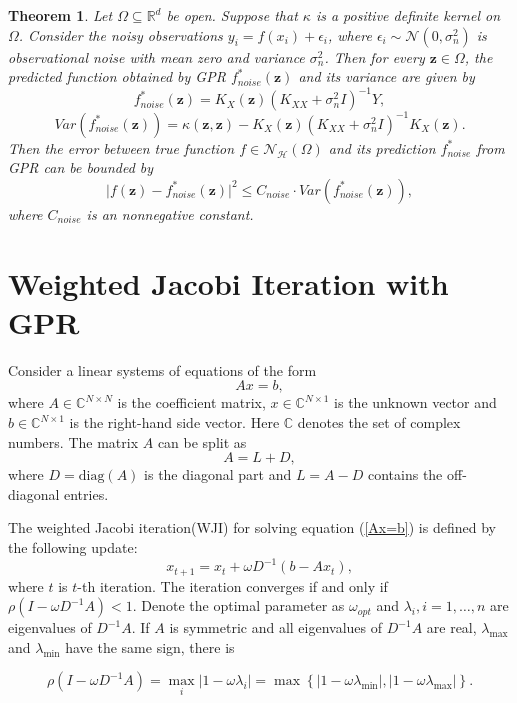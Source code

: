 \documentclass[preprint,review,sort&compress,3p]{elsarticle}
\newtheorem{thm}{Theorem }[section]
\begin{document}
\begin{thm}
	Let $\Omega \subseteq \mathbb{R}^d$ be open. Suppose that $\kappa$ is a positive definite kernel on $\Omega$. Consider the noisy observations $y_i = f(x_i)+\epsilon_i$, where $\epsilon_i\sim\mathcal{N}(0,\sigma_n^2)$ is observational noise with mean zero and variance $\sigma_n^2$.
	Then for every $\boldsymbol{z}\in \Omega$, the predicted function obtained by GPR $f_{noise}^*(\boldsymbol{z})$  and  its variance are given by 
	\[f_{noise}^*(\boldsymbol{z}) = K_X(\boldsymbol{z}) (K_{XX}+\sigma_n^2 I)^{-1} Y,
	\]
	\[
	Var(f_{noise}^*(\boldsymbol{z})) = \kappa(\boldsymbol{z},\boldsymbol{z})-K_X(\boldsymbol{z}) (K_{XX}+\sigma_n^2 I)^{-1} K_X(\boldsymbol{z}).
	\]
	Then the error between true function $f\in \mathcal{N}_\mathcal{H} (\Omega)$ and its prediction $f_{noise}^*$ from GPR can be bounded by 
	\begin{equation}
		\vert f(\boldsymbol{z})-f_{noise}^*(\boldsymbol{z})\vert^2 \le C_{noise}\cdot Var(f_{noise}^*(\boldsymbol{z})),
	\end{equation}
	where $C_{noise}$ {  is an nonnegative constant.}
\end{thm}

\section{Weighted Jacobi Iteration with GPR}
\label{WJI-GPR}
Consider a linear systems of equations of the form
\begin{equation}
	\label{Ax=b}
	Ax = b,
\end{equation}
where $A \in \mathbb{C}^{N\times N}$ is the coefficient matrix, $x\in \mathbb{C}^{N\times 1}$ is the unknown vector and $b\in \mathbb{C}^{N\times 1}$ is the right-hand side vector. Here $\mathbb{C}$ denotes the set of complex numbers. The matrix $A$ can be split as
$$
A = L+D, 
$$
where $D=\text{diag}(A)$ { is the diagonal part} and $L = A-D$ contains the off-diagonal entries.


The weighted Jacobi iteration(WJI) \cite{Y-2003} for solving equation (\ref{Ax=b}) is defined by the following update:
$$
x_{t+1} = x_t+\omega D^{-1}(b-Ax_t), 
$$
where $t$ is $t$-th iteration. The iteration converges if and only if $\rho(I-\omega D^{-1}A)<1$.  Denote the optimal parameter as $\omega_{opt}$ and $\lambda_i, i=1, \dots, n$ are eigenvalues of $D^{-1}A$. If $A$ is symmetric and all eigenvalues of $D^{-1}A$ are real,  $\lambda_{\max}$ and $\lambda_{\min}$ have the same sign, there is 

\begin{equation}
	\rho(I-\omega D^{-1}A) = \max\limits_{i}\left\vert 1-\omega \lambda_i  \right\vert = \max\left\{ \left\vert 1-\omega\lambda_{\min} \right\vert, \left\vert 1-\omega\lambda_{\max} \right\vert \right\}. 
\end{equation}
\end{document}
